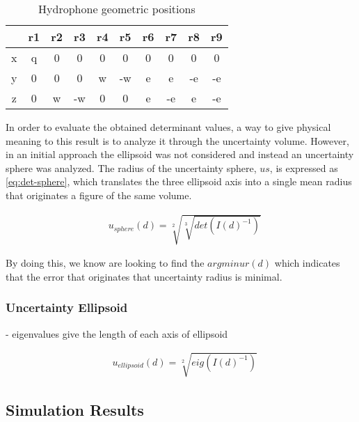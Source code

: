 \begin{table}[!htbp] %
	\begin{center}
		\begin{tabular}{|c| c c c c c c c c c|}
			\hline
			
			& r1 & r2 & r3 & r4	& r5 & r6 & r7 & r8	& r9 \\ \hline 
			\multirow{1}{0.5em}{x} 
			& q & 0 & 0 & 0 & 0 & 0 & 0 & 0 & 0\\
			\hline 
			\multirow{1}{0.5em}{y} 
			& 0 & 0 & 0 & w & -w & e & e & -e & -e\\
			\hline 
			\multirow{1}{0.5em}{z} 
			& 0 & w & -w & 0 & 0 & e & -e & e & -e \\
			\hline 
		\end{tabular}
		\caption{Hydrophone geometric positions}
		\label{tab:config-9h}
	\end{center}
\end{table}

In order to evaluate the obtained determinant values, a way to give physical meaning to this result is to analyze it through the uncertainty volume. However, in an initial approach the ellipsoid was not considered and instead an uncertainty sphere was analyzed. The radius of the uncertainty sphere, $us$, is expressed as \ref{eq:det-sphere}, which translates the three ellipsoid axis into a single mean radius that originates a figure of the same volume.

\begin{eqnarray}
& u_{sphere}(d) = \sqrt[2]{\sqrt[3]{det(I(d)^{-1})}}
\label{eq:det-sphere}
\end{eqnarray}

By doing this, we know are looking to find the $argmin ur(d)$ which indicates that the error that originates that uncertainty radius is minimal.

\subsubsection{Uncertainty Ellipsoid}

- eigenvalues give the length of each axis of ellipsoid

\begin{eqnarray}
& u_{ellipsoid}(d) = \sqrt[2]{eig(I(d)^{-1})}
\label{eq:det-ellip}
\end{eqnarray}


\subsection{Simulation Results}

